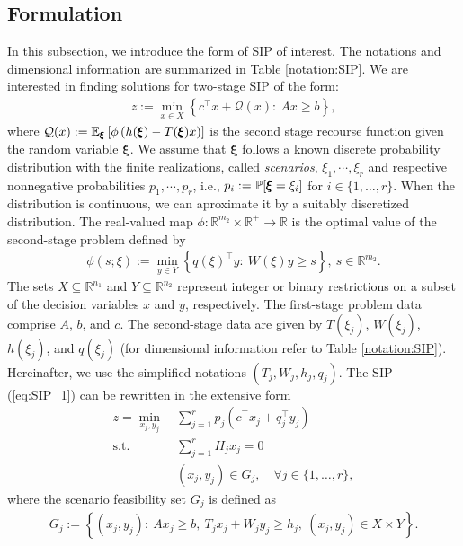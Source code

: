 \subsection{Formulation}
In this subsection, we introduce the form of SIP of interest. The notations and dimensional information are summarized in Table \ref{notation:SIP}. We are interested in finding solutions for two-stage SIP of the form: 
\begin{align}
z:=\min_{x\in X}{\left\{c^\top x + \mathcal{Q}(x):\ Ax\ge b\right\}}, \label{eq:SIP_1}
\end{align}
where $\mathcal{Q}(x):=\operatorname*{\mathbb{E}}_{\pmb{\xi}}\left[ \phi\left( h(\pmb{\xi})-T(\pmb{\xi})x \right) \right]$ is the second stage recourse function given the random variable $\pmb{\xi}$. We assume that $\pmb{\xi}$ follows a known discrete probability distribution with the finite realizations, called \textit{scenarios}, $\xi_1,\cdots,\xi_r$ and respective nonnegative probabilities $p_1,\cdots,p_r$, i.e., $p_i:=\operatorname*{\mathbb{P}}[\pmb{\xi}=\xi_i]$ for $i\in\{1,\ldots,r\}$. When the distribution is continuous, we can aproximate it by a suitably discretized distribution. The real-valued map $\phi:\mathbb{R}^{m_2}\times\mathbb{R}^{+}\to\mathbb{R}$ is the optimal value of the second-stage problem defined by
\begin{align}
\phi(s;\xi):=\min_{y\in Y}\left\{ q(\xi)^\top y:\ W(\xi)y \ge s \right\},\ s\in\mathbb{R}^{m_2}.
\end{align}
The sets $X\subseteq \mathbb{R}^{n_1}$ and $Y\subseteq\mathbb{R}^{n_2}$ represent integer or binary restrictions on a subset of the decision variables $x$ and $y$, respectively. 
The first-stage problem data comprise $A$, $b$, and $c$. The second-stage data are given by $T(\xi_j)$, $W(\xi_j)$, $h(\xi_j)$, and $q(\xi_j)$ (for dimensional information refer to Table \ref{notation:SIP}). Hereinafter, we use the simplified notations $(T_j,W_j,h_j,q_j)$.
The SIP (\ref{eq:SIP_1}) can be rewritten in the extensive form
\begin{subequations}
\begin{align}
z=\min_{x_j,y_j}\ &\sum_{j=1}^{r}p_j\left(c^{\top}x_j+q_j^{\top}y_j\right)	\label{eq:SIP_2-1}\\ 
\mathrm{s.t.}\ &\sum_{j=1}^{r}H_j x_j=0 \label{eq:SIP_2-2} \\
\ &(x_j,y_j)\in G_j,\quad \forall j\in\{1,\ldots,r\},	\label{eq:SIP_2-3}
\end{align}
\end{subequations}
where the scenario feasibility set $G_j$ is defined as
\begin{align}
G_j:=\left\{ (x_j,y_j): \ Ax_j\ge b,\  T_j x_j+W_j y_j\ge h_j,\ (x_j,y_j)\in X\times Y  \right\}.
\end{align}
